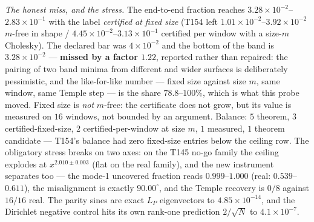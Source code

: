 \documentclass[11pt,a4paper]{article}
\begin{document}
\emph{The honest miss, and the stress.} The end-to-end fraction reaches
$3.28\times10^{-2}$--$2.83\times10^{-1}$ with the label \emph{certified at fixed size}
(T154 left $1.01\times10^{-2}$--$3.92\times10^{-2}$ $m$-free in shape /
$4.45\times10^{-2}$--$3.13\times10^{-1}$ certified per window with a size-$m$ Cholesky).
The declared bar was $4\times10^{-2}$ and the bottom of the band is $3.28\times10^{-2}$
--- \textbf{missed by a factor $1.22$}, reported rather than repaired: the pairing of two
band minima from different and wider surfaces is deliberately pessimistic, and the
like-for-like number --- fixed size against size $m$, same window, same Temple step --- is
the share $78.8$--$100\%$, which is what this probe moved. Fixed size is \emph{not}
$m$-free: the certificate does not grow, but its value is measured on $16$ windows, not
bounded by an argument. Balance: $5$ theorem, $3$ certified-fixed-size, $2$
certified-per-window at size $m$, $1$ measured, $1$ theorem candidate --- T154's balance
had zero fixed-size entries below the ceiling row. The obligatory stress breaks on two
axes: on the T145 no-go family the ceiling explodes at $x^{2.010\pm0.003}$ (flat on the
real family), and the new instrument separates too --- the mode-1 uncovered fraction reads
$0.999$--$1.000$ (real: $0.539$--$0.611$), the misalignment is exactly $90.00^\circ$, and
the Temple recovery is $0/8$ against $16/16$ real. The parity sines are exact $L_P$
eigenvectors to $4.85\times10^{-14}$, and the Dirichlet negative control hits its own
rank-one prediction $2/\sqrt N$ to $4.1\times10^{-7}$.
\end{document}
